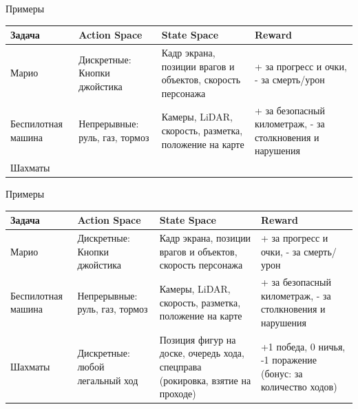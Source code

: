 \documentclass[aspectratio=169,12pt,t,compress]{beamer}
\begin{document}
\begin{frame}{Примеры}
	\centering
	\small
	\begin{tabular}{|p{2.2cm}|p{2.8cm}|p{4.0cm}|p{3cm}|}
		\hline
		\textbf{Задача}    & \textbf{Action Space}          & \textbf{State Space}                                       & \textbf{Reward}                                           \\
		\hline
		Марио              & Дискретные: Кнопки джойстика   & Кадр экрана, позиции врагов и объектов, скорость персонажа & + за прогресс и очки, - за смерть/урон                    \\		\hline
		Беспилотная машина & Непрерывные: руль, газ, тормоз & Камеры, LiDAR, скорость, разметка, положение на карте      & + за безопасный километраж, - за столкновения и нарушения \\
		\hline
		Шахматы            &                                &                                                            &                                                           \\
		\hline
	\end{tabular}
\end{frame}

\begin{frame}{Примеры}
	\centering
	\small
	\begin{tabular}{|p{2.2cm}|p{2.8cm}|p{4.0cm}|p{3cm}|}
		\hline
		\textbf{Задача}    & \textbf{Action Space}           & \textbf{State Space}                                                           & \textbf{Reward}                                               \\
		\hline
		Марио              & Дискретные: Кнопки джойстика    & Кадр экрана, позиции врагов и объектов, скорость персонажа                     & + за прогресс и очки, - за смерть/урон                        \\
		\hline
		Беспилотная машина & Непрерывные: руль, газ, тормоз  & Камеры, LiDAR, скорость, разметка, положение на карте                          & + за безопасный километраж, - за столкновения и нарушения     \\
		\hline
		Шахматы            & Дискретные: любой легальный ход & Позиция фигур на доске, очередь хода, спецправа (рокировка, взятие на проходе) & +1 победа, 0 ничья, -1 поражение (бонус: за количество ходов) \\
		\hline
	\end{tabular}
\end{frame}

\end{document}
